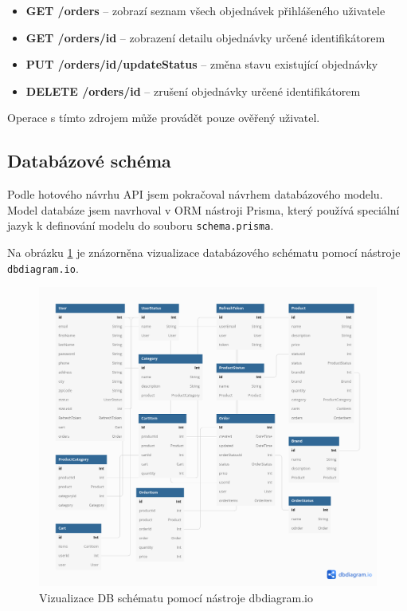 \documentclass[thesis=M,czech]{FITthesis}[2019/12/23]
\begin{document}
\begin{itemize}
  \item \textbf{GET /orders} -- zobrazí seznam všech objednávek přihlášeného uživatele
  \item \textbf{GET /orders/{id}} -- zobrazení detailu objednávky určené identifikátorem
  \item \textbf{PUT /orders/{id}/updateStatus} -- změna stavu existující objednávky
  \item \textbf{DELETE /orders/{id}} -- zrušení objednávky určené identifikátorem
\end{itemize}

Operace s tímto zdrojem může provádět pouze ověřený uživatel.

\subsection*{Databázové schéma}
Podle hotového návrhu API jsem pokračoval návrhem databázového modelu. Model databáze jsem navrhoval v ORM nástroji Prisma, který používá speciální jazyk k definování modelu do souboru \texttt{schema.prisma}.

Na obrázku \ref{schema-dbdiagram} je znázorněna vizualizace databázového schématu pomocí nástroje \texttt{dbdiagram.io}.

\begin{figure}[h]
    \includegraphics[width=\linewidth]{img/schema-dbdiagram.png}
    \caption{Vizualizace DB schématu pomocí nástroje dbdiagram.io}
	\label{schema-dbdiagram}
\end{figure}
\end{document}
